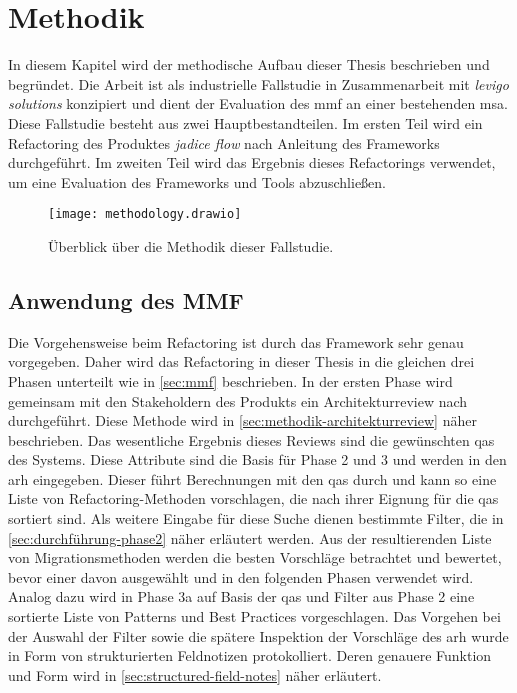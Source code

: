 \chapter{Methodik}
\label{chap:methodik}

In diesem Kapitel wird der methodische Aufbau dieser Thesis beschrieben und begründet.
Die Arbeit ist als industrielle Fallstudie in Zusammenarbeit mit \emph{levigo solutions} konzipiert und dient der Evaluation des \gls{mmf} an einer bestehenden \acrlong{msa}.
Diese Fallstudie besteht aus zwei Hauptbestandteilen.
Im ersten Teil wird ein Refactoring des Produktes \emph{jadice flow} nach Anleitung des Frameworks durchgeführt.
Im zweiten Teil wird das Ergebnis dieses Refactorings verwendet, um eine Evaluation des Frameworks und Tools abzuschließen.

\begin{figure}[!ht]
	\centering
	\texttt{[image: methodology.drawio]}
	\caption[Überblick über die Methodik dieser Fallstudie]{
		Überblick über die Methodik dieser Fallstudie.
	}
	\label{fig:methodology}
\end{figure}

\section{Anwendung des MMF}

Die Vorgehensweise beim Refactoring ist durch das Framework sehr genau vorgegeben.
Daher wird das Refactoring in dieser Thesis in die gleichen drei Phasen unterteilt wie in \cref{sec:mmf} beschrieben.
In der ersten Phase wird gemeinsam mit den Stakeholdern des Produkts ein Architekturreview nach  durchgeführt.
Diese Methode wird in \cref{sec:methodik-architekturreview} näher beschrieben.
Das wesentliche Ergebnis dieses Reviews sind die gewünschten \glspl{qa} des Systems.
Diese Attribute sind die Basis für Phase 2 und 3 und werden in den \gls{arh} eingegeben.
Dieser führt Berechnungen mit den \glspl{qa} durch und kann so eine Liste von Refactoring-Methoden vorschlagen, die nach ihrer Eignung für die \glspl{qa} sortiert sind.
Als weitere Eingabe für diese Suche dienen bestimmte Filter, die in \cref{sec:durchführung-phase2} näher erläutert werden.
Aus der resultierenden Liste von Migrationsmethoden werden die besten Vorschläge betrachtet und bewertet, bevor einer davon ausgewählt und in den folgenden Phasen verwendet wird.
Analog dazu wird in Phase 3a auf Basis der \glspl{qa} und Filter aus Phase 2 eine sortierte Liste von Patterns und Best Practices vorgeschlagen.
Das Vorgehen bei der Auswahl der Filter sowie die spätere Inspektion der Vorschläge des \gls{arh} wurde in Form von strukturierten Feldnotizen protokolliert.
Deren genauere Funktion und Form wird in \cref{sec:structured-field-notes} näher erläutert.

